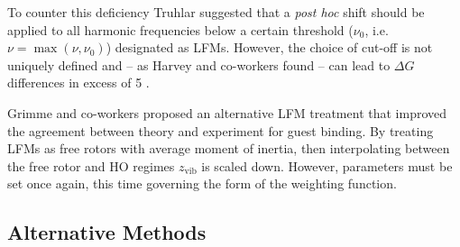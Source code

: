 \documentclass[../main.tex]{subfiles}
\begin{document}
To counter this deficiency Truhlar suggested that a \emph{post hoc} shift should be applied to all harmonic frequencies below a certain threshold ($\nu_0$, i.e. $\nu = \max(\nu, \nu_0)$) designated as LFMs.\cite{Ribeiro2011} However, the choice of cut-off is not uniquely defined and -- as Harvey and co-workers found -- can lead to $\Delta G$ differences in excess of 5 \kcal.\cite{Liu2017} 

Grimme and co-workers proposed an alternative LFM treatment that improved the agreement between theory and experiment for guest binding.\cite{Grimme2012} By treating LFMs as free rotors with average moment of inertia, then interpolating between the free rotor and HO regimes $z_\text{vib}$ is scaled down. However, parameters must be set once again, this time governing the form of the weighting function. 


\subsection{Alternative Methods}
\end{document}
